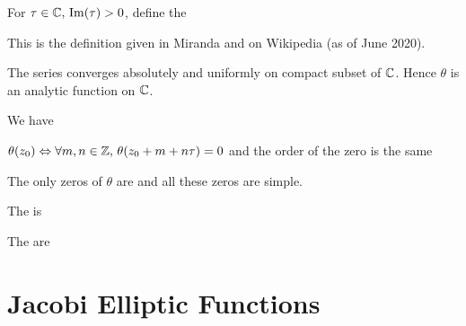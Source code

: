 \documentclass{article}
\begin{document}
\begin{definition}
	For $\tau \in \mathbb{C}, \, \operatorname{Im}(\tau)>0$, define the  
\end{definition}

\begin{remark}
	This is the definition given in Miranda and on Wikipedia (as of June 2020). 
\end{remark}

\begin{prop}
	The series converges absolutely and uniformly on compact subset of $\mathbb{C}$. Hence $\theta$ is an analytic function on $\mathbb{C}$. 
\end{prop}

\begin{prop}
	We have 
\end{prop}

\begin{corollary}
	$\theta(z_0) \Leftrightarrow \forall m,n \in \mathbb{Z}, \, \theta(z_0 + m + n\tau)=0$ and the order of the zero is the same
\end{corollary}

\begin{prop}
	The only zeros of $\theta$ are 
and all these zeros are simple. 
\end{prop}

\begin{definition}
	The  is 
\end{definition}

\begin{definition}
	The  are 
\end{definition}
\section{Jacobi Elliptic Functions}


\end{document}
